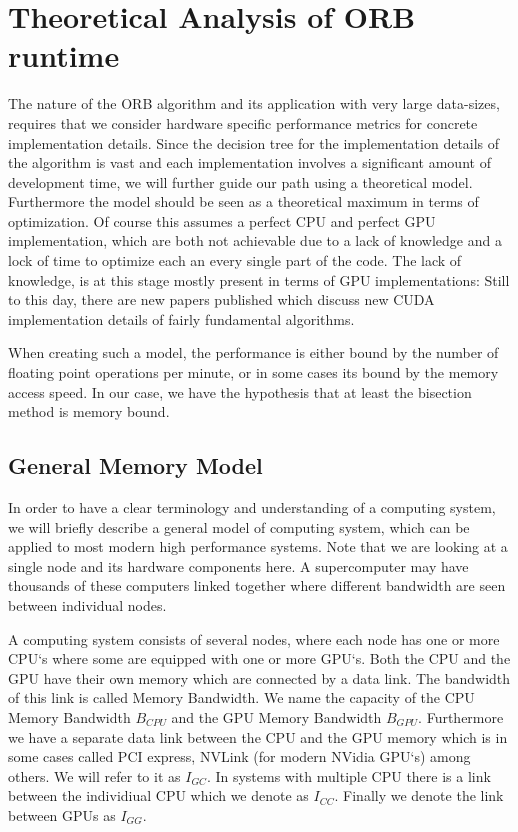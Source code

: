 \documentclass[]{article}
\begin{document}
\newpage
\section{Theoretical Analysis of ORB runtime}

The nature of the ORB algorithm and its application with very large data-sizes, requires that we consider hardware specific performance metrics for concrete implementation details. Since the decision tree for the implementation details of the algorithm is vast and each implementation involves a significant amount of development time, we will further guide our path using a theoretical model. Furthermore the model should be seen as a theoretical maximum in terms of optimization. Of course this assumes a perfect CPU and perfect GPU implementation, which are both not achievable due to a lack of knowledge and a lock of time to optimize each an every single part of the code. The lack of knowledge, is at this stage mostly present in terms of GPU implementations: Still to this day, there are new papers published which discuss new CUDA implementation details of fairly fundamental algorithms. 

When creating such a model, the performance is either bound by the number of floating point operations per minute, or in some cases its bound by the memory access speed. In our case, we have the hypothesis that at least the bisection method is memory bound.

\subsection{General Memory Model}\label{sec:gmm}

In order to have a clear terminology and understanding of a computing system, we will briefly describe a general model of computing system, which can be applied to most modern high performance systems. Note that we are looking at a single node and its hardware components here. A supercomputer may have thousands of these computers linked together where different bandwidth are seen between individual nodes. 

A computing system consists of several nodes, where each node has one or more CPU`s where some are equipped with one or more GPU`s. Both the CPU and the GPU have their own memory which are connected by a data link. The bandwidth of this link is called Memory Bandwidth. We name the capacity of the CPU Memory Bandwidth $B_{CPU}$ and the GPU Memory Bandwidth $B_{GPU}$. Furthermore we have a separate data link between the CPU and the GPU memory which is in some cases called PCI express, NVLink (for modern NVidia GPU`s) among others. We will refer to it as $I_{GC}$. In systems with multiple CPU there is a link between the individiual CPU which we denote as $I_{CC}$. Finally we denote the link between GPUs as $I_{GG}$.
\end{document}
